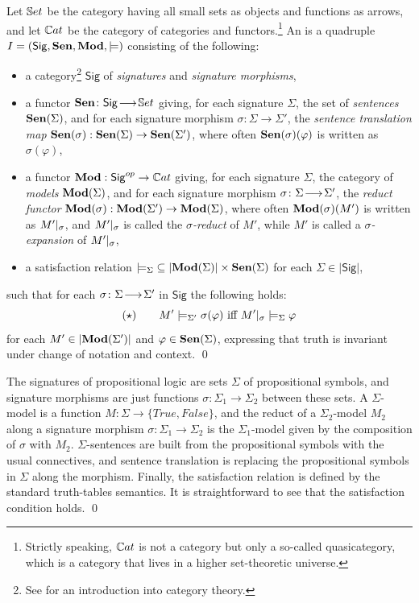 \documentclass[10pt,fleqn,final]{scrreprt}
\newcommand{\Sig}{\mathsf{Sig}}
\newenvironment{definitions}[0]{\medskip }{}
\begin{document}
\begin{definitions}
\begin{definition}\label{def:inst}  Let $\mathbb{S}et$ be the
category having all small \textsc{}sets as objects and functions as
arrows, and let $\mathbb{C}at$ be the category
of categories and functors.\footnote {Strictly speaking, $\mathbb{C}at$ is not a
category but only a so-called quasicategory, which is a category that
lives in a higher set-theoretic universe.}
An
 \cite{GoguenBurstall92} is a quadruple $I=(\Sig,\sen,\IMod,{\models})$
consisting of the following:
%
\begin{itemize}
\item a category\footnote{See \cite{AHS,MacLane} for an introduction into category theory.} $\Sig$ of \emph{signatures} and \emph{signature morphisms},
\item a functor $\sen\map{\Sig}{\Set}$  giving, for each signature $\Sigma$, the set of
\emph{sentences} $\mathbf {Sen}(\Sigma)$, and for each signature morphism
$\sigma:{\Sigma}\to{\Sigma'}$, the \emph{sentence translation map}
$\mathbf {Sen}(\sigma):{\mathbf {Sen}(\Sigma)}\to{\mathbf {Sen}(\Sigma')}$, where often
$\mathbf {Sen}(\sigma)(\varphi)$ is written as $\sigma(\varphi)$, \item a
functor $\IMod:{\Sig^{op}}\to{\Cat}$ giving, for each signature
$\Sigma$, the category of \emph{models} $\mathbf{Mod}(\Sigma)$, and for each
signature morphism $\sigma\colon\Sigma\!\longrightarrow\!\Sigma'$, the \emph{reduct
functor\/} $\mathbf{Mod}(\sigma):{\mathbf{Mod}(\Sigma')}\to {\mathbf{Mod}(\Sigma)}$, where
often $\mathbf{Mod}(\sigma)(M')$ is written as $M'|_{\sigma}$, and
$M'|_{\sigma}$ is called the \emph{$\sigma$-reduct} of $M'$,
while $M'$ is called a \emph{$\sigma$-expansion} of
$M'|_{\sigma}$,
\item a satisfaction relation
${\models_{\Sigma}}\subseteq|{\mathbf{Mod}(\Sigma)|\times\mathbf {Sen}(\Sigma)}$ for
each $\Sigma\in |\Sig|$,
\end{itemize}
%
such that for each $\sigma\colon\Sigma\!\longrightarrow\!\Sigma'$ in $\Sig$ the following  holds:
$$
(\star) \qquad M'\models_{\Sigma'}\sigma(\varphi) \mbox{ iff }
M'|_{\sigma} \models_{\Sigma} \varphi
$$
for each $M'\in |\mathbf{Mod}(\Sigma')|$ and $\varphi\in \mathbf {Sen}(\Sigma)$,
expressing that truth is invariant under change of notation and
context.  \qed
\end{definition}

\begin{definition}\label{Prop}
The signatures of propositional logic are sets $\Sigma$ of propositional symbols, and signature morphisms are just
functions $\sigma:{\Sigma_1}\to{\Sigma_2}$ between these sets. 
A $\Sigma$-model is a function $M : {\Sigma}\to{\{True, False\}}$, and the reduct of a 
$\Sigma_2$-model $M_2$ along a signature morphism $\sigma:{\Sigma_1}\to{\Sigma_2}$ is 
the $\Sigma_1$-model given by the composition of $\sigma$ with $M_2$. $\Sigma$-sentences are built from the
propositional symbols with the usual connectives, and sentence translation is replacing the propositional
symbols in $\Sigma$ along the morphism. Finally, the satisfaction relation is defined by the standard truth-tables
semantics. It is straightforward to see that the satisfaction condition holds.
\qed\end{definition}



\end{definitions}
\end{document}
